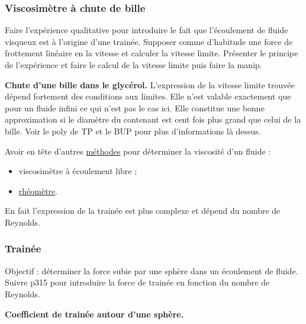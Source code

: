 \subsubsection{Viscosimètre à chute de bille}

Faire l'expérience qualitative pour introduire le fait que l'écoulement de fluide visqueux est à l'origine d'une trainée.
Supposer \og comme d'habitude \fg{} une force de frottement linéaire en la vitesse et calculer la vitesse limite.
Présenter le principe de l'expérience et faire le calcul de la vitesse limite puis faire la manip.

\begin{experience}
\textbf{Chute d'une bille dans le glycérol.}
L'expression de la vitesse limite trouvée dépend fortement des conditions aux limites.
Elle n'est valable exactement que pour un fluide infini ce qui n'est pas le cas ici.
Elle constitue une bonne approximation si le diamètre du contenant est cent fois plus grand que celui de la bille.
Voir le poly de TP et le BUP pour plus d'informations là dessus.
\end{experience}

\begin{remarque}
Avoir en tête d'autres \href{https://fr.wikipedia.org/wiki/Viscosim\%C3\%A8tre}{méthodes} pour déterminer la viscosité d'un fluide :
\begin{itemize}
\item viscosimètre à écoulement libre ;
\item \href{https://fr.wikipedia.org/wiki/Rh\%C3\%A9om\%C3\%A8tre}{rhéomètre}.
\end{itemize}
\end{remarque}

\begin{transition}
En fait l'expression de la trainée est plus complexe et dépend du nombre de Reynolds.
\end{transition}

\subsubsection{Trainée}

Objectif : déterminer la force subie par une sphère dans un écoulement de fluide.
Suivre \cite{Sanz2016} p315 pour introduire la force de trainée en fonction du nombre de Reynolds.
\begin{slide}
\textbf{Coefficient de trainée autour d'une sphère.}
\end{slide}

